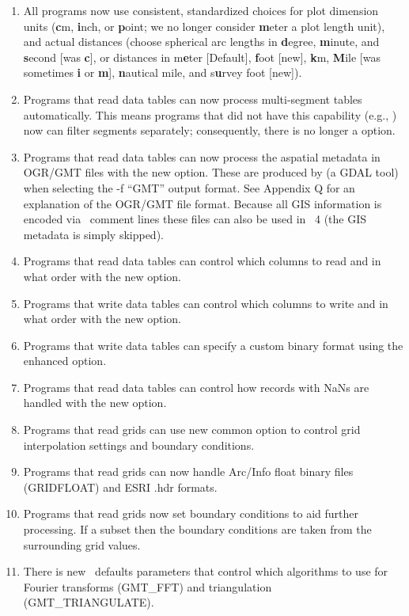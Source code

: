 \begin{enumerate}
	\item All programs now use consistent, standardized choices for plot dimension units (\textbf{c}m, \textbf{i}nch, or
	\textbf{p}oint;
		we no longer consider \textbf{m}eter a plot length unit), and actual distances (choose spherical arc lengths in \textbf{d}egree,
		\textbf{m}inute, and \textbf{s}econd [was \textbf{c}], or distances in m\textbf{e}ter [Default], \textbf{f}oot [new], 
		\textbf{k}m, \textbf{M}ile [was sometimes \textbf{i} or \textbf{m}], \textbf{n}autical mile, and s\textbf{u}rvey foot [new]).
	\item Programs that read data tables can now process multi-segment tables automatically.  This means
		programs that did not have this capability (e.g., ) now can filter segments
		separately; consequently, there is no longer a  option.
	\item Programs that read data tables can now process the aspatial metadata in OGR/GMT files with the new  option.
		These are produced by  (a GDAL tool) when selecting the -f ``GMT'' output format.  See Appendix Q
		for an explanation of the OGR/GMT file format.  Because all GIS information is encoded via \GMT\ comment lines
		these files can also be used in \GMT\ 4 (the GIS metadata is simply skipped).
	\item Programs that read data tables can control which columns to read and in what order with the new  option.
	\item Programs that write data tables can control which columns to write and in what order with the new  option.
	\item Programs that write data tables can specify a custom binary format using the enhanced  option.
	\item Programs that read data tables can control how records with NaNs are handled with the new  option.
	\item Programs that read grids can use new common option  to control grid interpolation settings and boundary conditions.
	\item Programs that read grids can now handle Arc/Info float binary files (GRIDFLOAT) and ESRI .hdr formats.
	\item Programs that read grids now set boundary conditions to aid further processing.  If a subset then the
		boundary conditions are taken from the surrounding grid values.
	\item There is new \gmt\ defaults parameters that control which algorithms to use for Fourier transforms (GMT\_FFT) and triangulation (GMT\_TRIANGULATE).

\end{enumerate}
